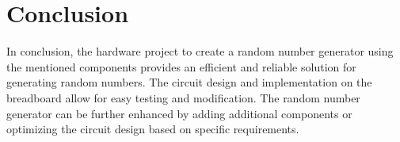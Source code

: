 \documentclass[a4paper,12pt]{article}
\begin{document}
\section{Conclusion}
In conclusion, the hardware project to create a random number generator using the mentioned components provides an efficient and reliable solution for generating random numbers. The circuit design and implementation on the breadboard allow for easy testing and modification. The random number generator can be further enhanced by adding additional components or optimizing the circuit design based on specific requirements.
\end{document}
